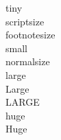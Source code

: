 \documentclass[20pt]{article}
\begin{document}
	
	\noindent
	{\tiny tiny}\\
	{\scriptsize scriptsize}\\
	{\footnotesize footnotesize}\\
	{\small small}\\
	{\normalsize normalsize}\\
	{\large large}\\
	{\Large Large}\\
	{\LARGE LARGE}\\
	{\huge huge}\\
	{\Huge Huge}\\ 
	
	
\end{document}
